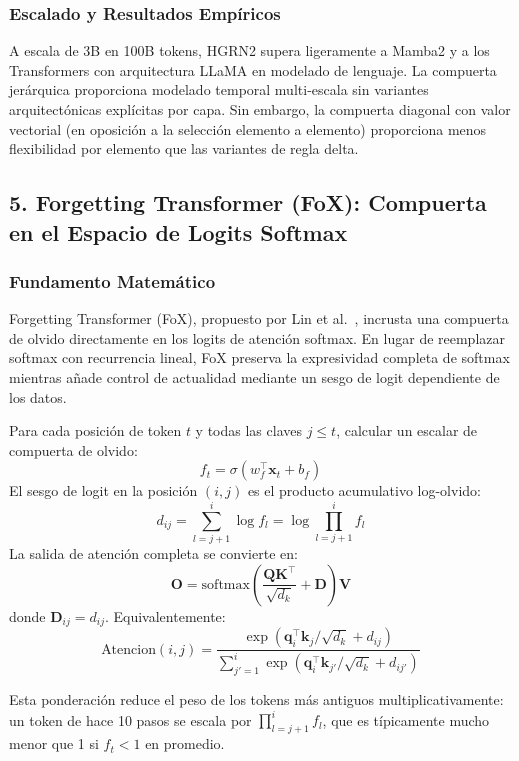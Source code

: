 \subsubsection{Escalado y Resultados Empíricos}

A escala de 3B en 100B tokens, HGRN2 supera ligeramente a Mamba2 y a los Transformers con arquitectura LLaMA en modelado de lenguaje. La compuerta jerárquica proporciona modelado temporal multi-escala sin variantes arquitectónicas explícitas por capa. Sin embargo, la compuerta diagonal con valor vectorial (en oposición a la selección elemento a elemento) proporciona menos flexibilidad por elemento que las variantes de regla delta.

\subsection{5. Forgetting Transformer (FoX): Compuerta en el Espacio de Logits Softmax}

\subsubsection{Fundamento Matemático}

Forgetting Transformer (FoX), propuesto por Lin et al.~\citep{lin_forgetting_transformer_2025}, incrusta una compuerta de olvido directamente en los logits de atención softmax. En lugar de reemplazar softmax con recurrencia lineal, FoX preserva la expresividad completa de softmax mientras añade control de actualidad mediante un sesgo de logit dependiente de los datos.

Para cada posición de token $t$ y todas las claves $j \le t$, calcular un escalar de compuerta de olvido:
\[
f_t = \sigma(w_f^\top \mathbf{x}_t + b_f)
\]
El sesgo de logit en la posición $(i,j)$ es el producto acumulativo log-olvido:
\[
d_{ij} = \sum_{l=j+1}^{i} \log f_l = \log \prod_{l=j+1}^{i} f_l
\]
La salida de atención completa se convierte en:
\[
\mathbf{O} = \text{softmax}\left(\frac{\mathbf{Q}\mathbf{K}^\top}{\sqrt{d_k}} + \mathbf{D}\right) \mathbf{V}
\]
donde $\mathbf{D}_{ij} = d_{ij}$. Equivalentemente:
\[
\text{Atencion}(i,j) = \frac{\exp(\mathbf{q}_i^\top \mathbf{k}_j / \sqrt{d_k} + d_{ij})}{\sum_{j'=1}^{i} \exp(\mathbf{q}_i^\top \mathbf{k}_{j'} / \sqrt{d_k} + d_{ij'})}
\]

Esta ponderación reduce el peso de los tokens más antiguos multiplicativamente: un token de hace 10 pasos se escala por $\prod_{l=j+1}^{i} f_l$, que es típicamente mucho menor que 1 si $f_t < 1$ en promedio.

